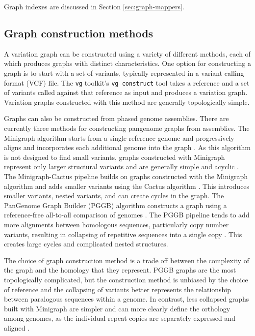 \documentclass[11pt]{ucscthesis}
\begin{document}
Graph indexes are discussed in Section \ref{sec:graph-mappers}.

\subsection{Graph construction methods}
\label{sec:graph-construction}

A variation graph can be constructed using a variety of different methods, each of which produces graphs with distinct characteristics.
One option for constructing a graph is to start with a set of variants, typically represented in a variant calling format (VCF) file.
The \texttt{vg} toolkit's \texttt{vg construct} tool takes a reference and a set of variants called against that reference as input and produces a variation graph.
Variation graphs constructed with this method are generally topologically simple. 

Graphs can also be constructed from phased genome assemblies.
There are currently three methods for constructing pangenome graphs from assemblies.
The Minigraph algorithm starts from a single reference genome and progressively aligns and incorporates each additional genome into the graph \cite{li_minigraph_2020}.
As this algorithm is not designed to find small variants, graphs constructed with Minigraph represent only larger structural variants and are generally simple and acyclic \cite{li_minigraph_2020}.
The Minigraph-Cactus pipeline builds on graphs constructed with the Minigraph algorithm and adds smaller variants using the Cactus algorithm \cite{minigraph_cactus_2024}. 
This introduces smaller variants, nested variants, and can create cycles in the graph.
The PanGenome Graph Builder (PGGB) algorithm constructs a graph using a reference-free all-to-all comparison of genomes \cite{pggb_2024}.
The PGGB pipeline tends to add more alignments between homologous sequences, particularly copy number variants, resulting in collapsing of repetitive sequences into a single copy \cite{hprc_pangenome_2023}.
This creates large cycles and complicated nested structures.

The choice of graph construction method is a trade off between the complexity of the graph and the homology that they represent.
PGGB graphs are the most topologically complicated, but the construction method is unbiased by the choice of reference and the collapsing of variants better represents the relationship between paralogous sequences within a genome.
In contrast, less collapsed graphs built with Minigraph are simpler and can more clearly define the orthology among genomes, as the individual repeat copies are separately expressed and aligned \cite{li_minigraph_2020}. 
\end{document}
